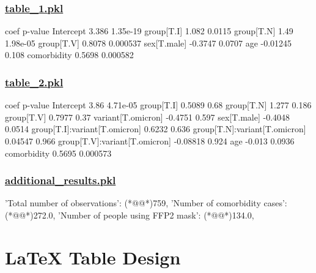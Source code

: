 \documentclass[11pt]{article}
\begin{document}
\subsubsection*{\hyperlink{code-Data Analysis-table-1-pkl}{table\_1.pkl}}

\begin{codeoutput}
                coef   p-value
Intercept      3.386  1.35e-19
group[T.I]     1.082    0.0115
group[T.N]      1.49  1.98e-05
group[T.V]    0.8078  0.000537
sex[T.male]  -0.3747    0.0707
age         -0.01245     0.108
comorbidity   0.5698  0.000582
\end{codeoutput}\hypertarget{file-table-2-pkl}{}

\subsubsection*{\hyperlink{code-Data Analysis-table-2-pkl}{table\_2.pkl}}

\begin{codeoutput}
                                  coef   p-value
Intercept                         3.86  4.71e-05
group[T.I]                      0.5089      0.68
group[T.N]                       1.277     0.186
group[T.V]                      0.7977      0.37
variant[T.omicron]             -0.4751     0.597
sex[T.male]                    -0.4048    0.0514
group[T.I]:variant[T.omicron]   0.6232     0.636
group[T.N]:variant[T.omicron]  0.04547     0.966
group[T.V]:variant[T.omicron] -0.08818     0.924
age                             -0.013    0.0936
comorbidity                     0.5695  0.000573
\end{codeoutput}\hypertarget{file-additional-results-pkl}{}

\subsubsection*{\hyperlink{code-Data Analysis-additional-results-pkl}{additional\_results.pkl}}

\begin{codeoutput}
{
    'Total number of observations': (*@@*)759,
    'Number of comorbidity cases': (*@@*)272.0,
    'Number of people using FFP2 mask': (*@@*)134.0,
}
\end{codeoutput}

\section{LaTeX Table Design}
\end{document}
